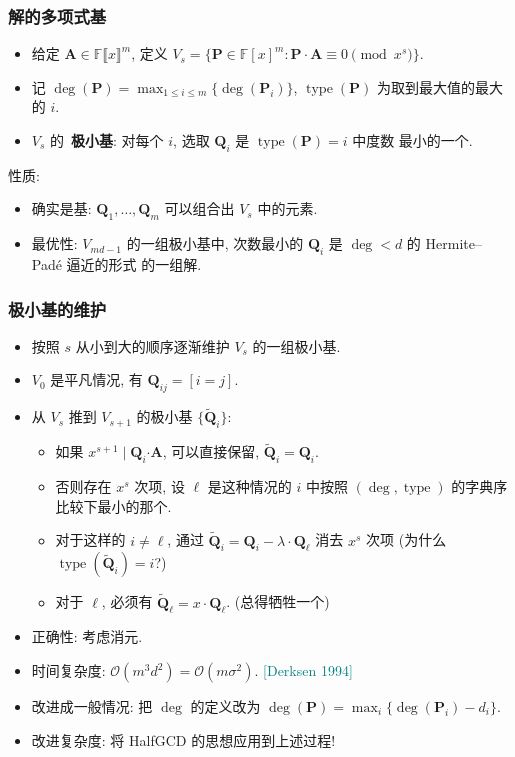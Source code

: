 \documentclass{ctexbeamer}
\newcommand{\cnote}[2][\footnotesize]{\textcolor{teal}{#1[#2]}}
\newcommand{\bigO}{\mathcal O}
\newcommand{\bbF}{\mathbb F}
\DeclareMathOperator{\type}{type}
\begin{document}
\begin{frame}
  \frametitle{解的多项式基}

  \begin{itemize}
    \item 给定 $\bm{A} \in \bbF \llbracket x \rrbracket^m$, 定义 $V_s = \{ \bm{P} \in \bbF[x]^m :
    \bm{P \cdot A} \equiv 0 \pmod {x^s} \}$.
    \item 记 $\deg (\bm{P}) = \max_{1\leq i \leq m} \{ \deg (\bm{P}_i) \}$, $\type (\bm{P})$ 为取到最大值的最大的 $i$.
    \item $V_s$ 的~\textbf{极小基}: 对每个 $i$, 选取 $\bm{Q}_i$ 是 $\type(\bm P) = i$ 中度数
    最小的一个.
  \end{itemize}
  性质:
  \begin{itemize}
    \item<2-> 确实是基: $\bm{Q}_1,\dots,\bm{Q}_m$ 可以组合出 $V_s$ 中的元素.
    \item<3-> 最优性: $V_{md - 1}$ 的一组极小基中, 次数最小的 $\bm{Q}_i$ 是 $\deg < d$ 的 Hermite--Pad\'e 逼近的形式
    的一组解.
  \end{itemize}

\end{frame}

\begin{frame}
  \frametitle{极小基的维护}

  \begin{itemize}
    \item 按照 $s$ 从小到大的顺序逐渐维护 $V_s$ 的一组极小基.
    \item $V_0$ 是平凡情况, 有 $\bm{Q}_{i j} = [i = j]$.
    \item 从 $V_s$ 推到 $V_{s+1}$ 的极小基 $\{ \widetilde {\bm{Q}}_{i} \}$:
    \begin{itemize}
      \item<2-> 如果 $x^{s+1} \mid\bm{Q}_i \bm{\cdot A}$, 可以直接保留, $\widetilde {\bm{Q}}_{i} = \bm{Q}_i$.
      \item<3-> 否则存在 $x^s$ 次项, 设 $\ell$ 是这种情况的 $i$ 中按照 $(\deg, \type)$ 的字典序比较下最小的那个.
      \item<4-> 对于这样的 $i \neq \ell$, 通过 $\widetilde{\bm{Q}}_i = \bm{Q}_i - \lambda \cdot \bm{Q}_\ell$
      消去 $x^s$ 次项 (为什么 $\type (\widetilde{\bm{Q}}_i) = i$?)
      \item<5-> 对于 $\ell$, 必须有 $\widetilde{\bm{Q}}_\ell = x\cdot \bm{Q}_\ell$. (总得牺牲一个)
    \end{itemize}
    \item<6-> 正确性: 考虑消元.
    \item<7-> 时间复杂度: $\bigO(m^3 d^2) = \bigO(m \sigma^2)$. \cnote{Derksen 1994}
    \item<8-> 改进成一般情况: 把 $\deg$ 的定义改为 $\deg (\bm P) = \max_i \{ \deg (\bm{P}_i) - d_i \}$.
    \item<9-> 改进复杂度: 将 HalfGCD 的思想应用到上述过程!
  \end{itemize}

\end{frame}
\end{document}

